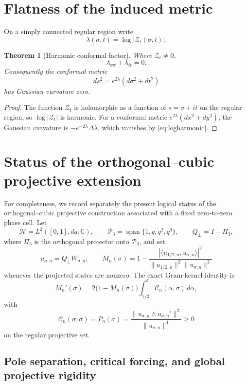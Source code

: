 \documentclass[11pt]{amsart}
\numberwithin{equation}{section}
\newtheorem{theorem}{Theorem}[section]
\newcommand{\Zcal}{\mathcal Z}
\begin{document}
\section{Flatness of the induced metric}

On a simply connected regular region write
\[
\lambda(\sigma,t)=\log|\Zcal_t(\sigma,t)|.
\]

\begin{theorem}[Harmonic conformal factor]
Where $\Zcal_t\ne0$,
\begin{equation}
\boxed{\lambda_{\sigma\sigma}+\lambda_{tt}=0.}
\label{eq:logharmonic}
\end{equation}
Consequently the conformal metric
\[
ds^2=e^{2\lambda}(d\sigma^2+dt^2)
\]
has Gaussian curvature zero.
\end{theorem}

\begin{proof}
The function $\Zcal_t$ is holomorphic as a function of $s=\sigma+it$ on the regular region, so $\log|\Zcal_t|$ is harmonic.  For a conformal metric $e^{2\lambda}(dx^2+dy^2)$, the Gaussian curvature is $-e^{-2\lambda}\Delta\lambda$, which vanishes by \eqref{eq:logharmonic}.
\end{proof}


\section{Status of the orthogonal--cubic projective extension}
\label{sec:oc-status}

For completeness, we record separately the present logical status of the
orthogonal--cubic projective construction associated with a fixed
zero-to-zero phase cell.  Let
\[
 \mathcal H=L^2([0,1],dq;\mathbb C),\qquad
 \mathcal P_3=\operatorname{span}\{1,q,q^2,q^3\},\qquad
 Q_\perp=I-\Pi_3,
\]
where $\Pi_3$ is the orthogonal projector onto $\mathcal P_3$, and set
\[
 u_{\sigma,n}=Q_\perp W_{\sigma,n},
 \qquad
 M_n(\sigma)
 =1-
 \frac{|\langle u_{1/2,n},u_{\sigma,n}\rangle|^2}
 {\|u_{1/2,n}\|^2\|u_{\sigma,n}\|^2}
\]
whenever the projected states are nonzero.  The exact Gram-kernel identity is
\[
 M_n'(\sigma)
 =2\bigl(1-M_n(\sigma)\bigr)
 \int_{1/2}^{\sigma}\mathcal C_n(\alpha,\sigma)\,d\alpha,
\]
with
\[
 \mathcal C_n(\sigma,\sigma)
 =P_n(\sigma)
 =\frac{\|u_{\sigma,n}\wedge u_{\sigma,n}'\|^2}
 {\|u_{\sigma,n}\|^4}\ge0
\]
on the regular projective set.


\subsection{Pole separation, critical forcing, and global projective rigidity}
\end{document}
